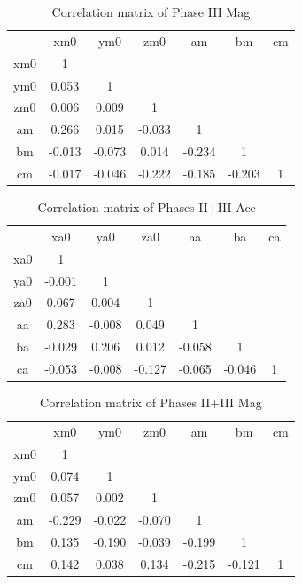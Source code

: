 \begin{table}
    \centering
    \begin{tabular}{c|c|c|c|c|c|c}
             &   xm0  & ym0    &   zm0  &   am   &   bm   & cm \\
         xm0 &  1     &        &        &        &        &    \\
         ym0 &  0.053 &  1     &        &        &        &    \\
         zm0 &  0.006 &  0.009 &  1     &        &        &    \\
         am  &  0.266 &  0.015 & -0.033 &  1     &        &    \\
         bm  & -0.013 & -0.073 &  0.014 & -0.234 &  1     &    \\
         cm  & -0.017 & -0.046 & -0.222 & -0.185 & -0.203 & 1  \\
    \end{tabular}
    \caption{Correlation matrix of Phase III Mag}
\end{table}

\begin{table}
    \centering
    \begin{tabular}{c|c|c|c|c|c|c}
             &   xa0  &   ya0  &   za0  &   aa   &   ba   & ca \\
         xa0 &  1     &        &        &        &        &    \\
         ya0 & -0.001 &  1     &        &        &        &    \\
         za0 &  0.067 &  0.004 &  1     &        &        &    \\
         aa  &  0.283 & -0.008 &  0.049 &  1     &        &    \\
         ba  & -0.029 &  0.206 &  0.012 & -0.058 &  1     &    \\
         ca  & -0.053 & -0.008 & -0.127 & -0.065 & -0.046 &  1 \\
    \end{tabular}
    \caption{Correlation matrix of Phases II+III Acc}
\end{table}

\begin{table}
    \centering
    \begin{tabular}{c|c|c|c|c|c|c}
             &   xm0  & ym0    &   zm0  &   am   &   bm   & cm \\
         xm0 &  1     &        &        &        &        &    \\
         ym0 &  0.074 &  1     &        &        &        &    \\
         zm0 &  0.057 &  0.002 &  1     &        &        &    \\
         am  & -0.229 & -0.022 & -0.070 &  1     &        &    \\
         bm  &  0.135 & -0.190 & -0.039 & -0.199 &  1     &    \\
         cm  &  0.142 &  0.038 &  0.134 & -0.215 & -0.121 & 1  \\
    \end{tabular}
    \caption{Correlation matrix of Phases II+III Mag}
\end{table}

